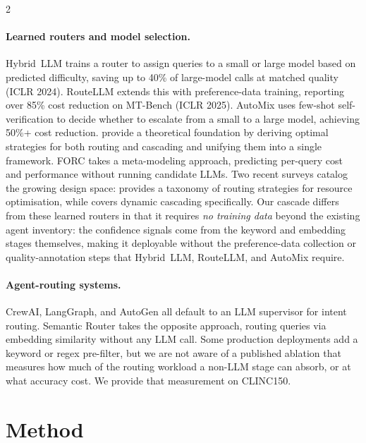 \documentclass[11pt,a4paper]{article}
\begin{document}
\begin{multicols}{2}
\paragraph{Learned routers and model selection.}
Hybrid~LLM \citep{ding2024hybridllm} trains a router to assign queries to a small or large model based on predicted difficulty, saving up to 40\% of large-model calls at matched quality (ICLR 2024). RouteLLM \citep{ong2025routellm} extends this with preference-data training, reporting over 85\% cost reduction on MT-Bench (ICLR 2025). AutoMix \citep{madaan2024automix} uses few-shot self-verification to decide whether to escalate from a small to a large model, achieving 50\%+ cost reduction. \citet{dekoninck2024unified} provide a theoretical foundation by deriving optimal strategies for both routing and cascading and unifying them into a single framework. FORC \citep{sakota2024forc} takes a meta-modeling approach, predicting per-query cost and performance without running candidate LLMs. Two recent surveys catalog the growing design space: \citet{survey2025routing} provides a taxonomy of routing strategies for resource optimisation, while \citet{survey2026dynamic} covers dynamic cascading specifically. Our cascade differs from these learned routers in that it requires \emph{no training data} beyond the existing agent inventory: the confidence signals come from the keyword and embedding stages themselves, making it deployable without the preference-data collection or quality-annotation steps that Hybrid~LLM, RouteLLM, and AutoMix require.

\paragraph{Agent-routing systems.}
CrewAI, LangGraph, and AutoGen all default to an LLM supervisor for intent routing. Semantic Router \citep{semanticrouter2024} takes the opposite approach, routing queries via embedding similarity without any LLM call. Some production deployments add a keyword or regex pre-filter, but we are not aware of a published ablation that measures how much of the routing workload a non-LLM stage can absorb, or at what accuracy cost. We provide that measurement on CLINC150.

\section{Method}


\end{multicols}
\end{document}
